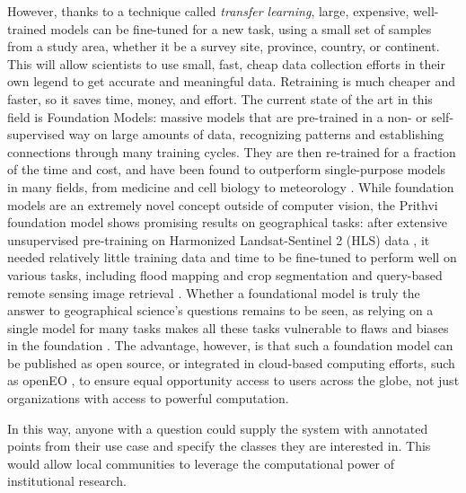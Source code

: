             However, thanks to a technique called \textit{transfer learning}, large, expensive, well-trained models can be fine-tuned for a new task, using a small set of samples \citep{tuia2016domain, hamrouni2021local} from a study area, whether it be a survey site, province, country, or continent. This will allow scientists to use small, fast, cheap data collection efforts in their own legend to get accurate and meaningful data. Retraining is much cheaper and faster, so it saves time, money, and effort. 
            The current state of the art in this field is Foundation Models: massive models that are pre-trained in a non- or self-supervised way on large amounts of data, recognizing patterns and establishing connections through many training cycles. They are then re-trained for a fraction of the time and cost, and have been found to outperform single-purpose models in many fields, from medicine \citep{moor2023foundation} and cell biology \citep{cui2024scgpt} to meteorology \citep{mukkavilli2023ai}. While foundation models are an extremely novel concept outside of computer vision, the Prithvi foundation model shows promising results on geographical tasks: after extensive unsupervised pre-training on Harmonized Landsat-Sentinel 2 (HLS) data \citep{claverie2018harmonized}, it needed relatively little training data and time to be fine-tuned to perform well on various tasks, including flood mapping and crop segmentation \citep{jakubik2023foundation} and query-based remote sensing image retrieval \citep{blumenstiel2024multi}. 
            Whether a foundational model is truly the answer to geographical science's questions remains to be seen, as relying on a single model for many tasks makes all these tasks vulnerable to flaws and biases in the foundation \citep{bommasani2021opportunities}. The advantage, however, is that such a foundation model can be published as open source, or integrated in cloud-based computing efforts, such as openEO \citep{pebesma2018openeo}, to ensure equal opportunity access to users across the globe, not just organizations with access to powerful computation. 

            In this way, anyone with a question could supply the system with annotated points from their use case and specify the classes they are interested in. This would allow local communities to leverage the computational power of institutional research.



